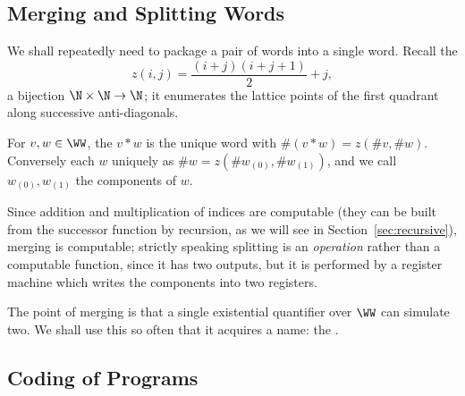 \subsection{Merging and Splitting Words}

We shall repeatedly need to package a pair of words into a single word. Recall the 
$$z(i,j) = \frac{(i+j)(i+j+1)}{2}+j,$$
a bijection $\N\times\N\to\N$; it enumerates the lattice points of the first quadrant along successive anti-diagonals.

\begin{definition}
	For $v,w \in \WW$, the  $v \ast w$ is the unique word with $\#(v\ast w) = z(\#v, \#w)$. Conversely each $w$  uniquely as $\#w = z(\#w_{(0)}, \#w_{(1)})$, and we call $w_{(0)}, w_{(1)}$ the components of $w$.
\end{definition}

Since addition and multiplication of indices are computable (they can be built from the successor function by recursion, as we will see in Section~\ref{sec:recursive}), merging is computable; strictly speaking splitting is an \emph{operation} rather than a computable function, since it has two outputs, but it is performed by a register machine which writes the components into two registers.

The point of merging is that a single existential quantifier over $\WW$ can simulate two. We shall use this so often that it acquires a name: the .

\subsection{Coding of Programs}

